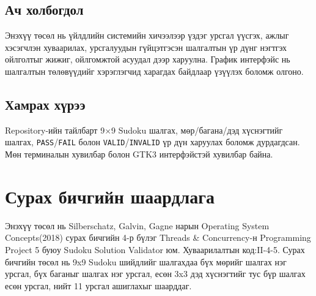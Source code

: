 \documentclass[12pt,a4paper]{report}
\begin{document}
	\section{Ач холбогдол}
	Энэхүү төсөл нь үйлдлийн системийн хичээлээр үздэг урсгал үүсгэх, ажлыг хэсэгчлэн хуваарилах, урсгалуудын гүйцэтгэсэн шалгалтын үр дүнг нэгтгэх ойлголтыг жижиг, ойлгомжтой асуудал дээр харуулна. График интерфэйс нь шалгалтын төлөвүүдийг хэрэглэгчид харагдах байдлаар үзүүлэх боломж олгоно.
	
	\section{Хамрах хүрээ}
	Repository-ийн тайлбарт 9$\times$9 Sudoku шалгах, мөр/багана/дэд хүснэгтийг шалгах, \texttt{PASS}/\texttt{FAIL} болон \texttt{VALID}/\texttt{INVALID} үр дүн харуулах боломж дурдагдсан. Мөн терминалын хувилбар болон GTK3 интерфэйстэй хувилбар байна.
	
	\chapter{Сурах бичгийн шаардлага}
	
	Энэхүү төсөл нь Silberschatz, Galvin, Gagne нарын Operating System Concepts(2018) сурах бичгийн 4-р бүлэг Threads & Concurrency-н Programming Project 5 буюу Sudoku Solution Validator юм. Хуваарилалтын код:II-4-5. Сурах бичгийн төсөл нь 9x9 Sudoku шийдлийг шалгахдаа бүх мөрийг шалгах нэг урсгал, бүх баганыг шалгах нэг урсгал, есөн 3x3 дэд хүснэгтийг тус бүр шалгах есөн урсгал, нийт 11 урсгал ашиглахыг шаарддаг.
	
\end{document}
